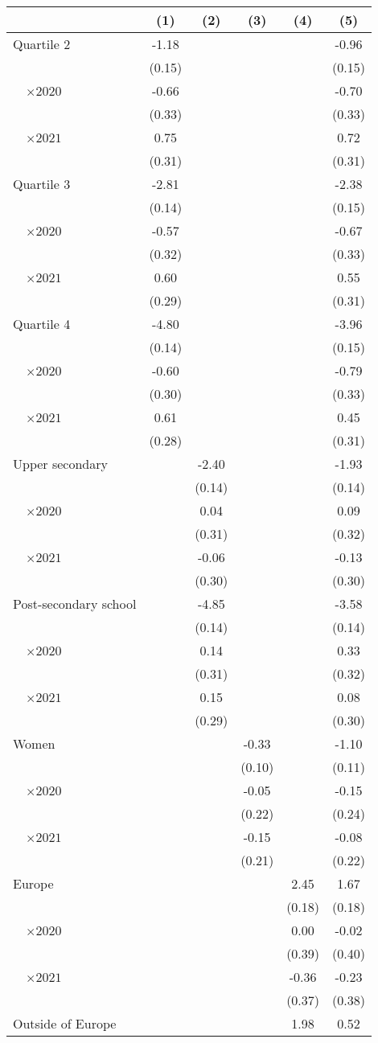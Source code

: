 
\begin{tabular}{@{}l*{5}{S[table-format={-}2.2{\tnote{***}}]}@{}}
\toprule
{} & {(1)} & {(2)} & {(3)} & {(4)} & {(5)}\tabularnewline%
\midrule
Quartile 2 & -1.18\tnote{***} &  &  &  & -0.96\tnote{***}\tabularnewline%
 & (0.15) &  &  &  & (0.15)\tabularnewline%
~~\(\times 2020\) & -0.66\tnote{*} &  &  &  & -0.70\tnote{*}\tabularnewline%
 & (0.33) &  &  &  & (0.33)\tabularnewline%
~~\(\times 2021\) & 0.75\tnote{*} &  &  &  & 0.72\tnote{*}\tabularnewline%
 & (0.31) &  &  &  & (0.31)\tabularnewline%
Quartile 3 & -2.81\tnote{***} &  &  &  & -2.38\tnote{***}\tabularnewline%
 & (0.14) &  &  &  & \vphantom{1} (0.15)\tabularnewline%
~~\(\times 2020\) & -0.57\tnote{\dagger} &  &  &  & -0.67\tnote{*}\tabularnewline%
 & (0.32) &  &  &  & (0.33)\tabularnewline%
~~\(\times 2021\) & 0.60\tnote{*} &  &  &  & 0.55\tnote{\dagger}\tabularnewline%
 & (0.29) &  &  &  & (0.31)\tabularnewline%
Quartile 4 & -4.80\tnote{***} &  &  &  & -3.96\tnote{***}\tabularnewline%
 & (0.14) &  &  &  & (0.15)\tabularnewline%
~~\(\times 2020\) & -0.60\tnote{*} &  &  &  & -0.79\tnote{*}\tabularnewline%
 & (0.30) &  &  &  & (0.33)\tabularnewline%
~~\(\times 2021\) & 0.61\tnote{*} &  &  &  & 0.45\tabularnewline%
 & (0.28) &  &  &  & (0.31)\tabularnewline%
Upper secondary &  & -2.40\tnote{***} &  &  & -1.93\tnote{***}\tabularnewline%
 &  & (0.14) &  &  & \vphantom{1} (0.14)\tabularnewline%
~~\(\times 2020\) &  & 0.04 &  &  & 0.09\tabularnewline%
 &  & (0.31) &  &  & \vphantom{1} (0.32)\tabularnewline%
~~\(\times 2021\) &  & -0.06 &  &  & -0.13\tabularnewline%
 &  & (0.30) &  &  & (0.30)\tabularnewline%
Post-secondary school &  & -4.85\tnote{***} &  &  & -3.58\tnote{***}\tabularnewline%
 &  & (0.14) &  &  & (0.14)\tabularnewline%
~~\(\times 2020\) &  & 0.14 &  &  & 0.33\tabularnewline%
 &  & (0.31) &  &  & (0.32)\tabularnewline%
~~\(\times 2021\) &  & 0.15 &  &  & 0.08\tabularnewline%
 &  & (0.29) &  &  & (0.30)\tabularnewline%
Women &  &  & -0.33\tnote{**} &  & -1.10\tnote{***}\tabularnewline%
 &  &  & (0.10) &  & (0.11)\tabularnewline%
~~\(\times 2020\) &  &  & -0.05 &  & -0.15\tabularnewline%
 &  &  & (0.22) &  & (0.24)\tabularnewline%
~~\(\times 2021\) &  &  & -0.15 &  & -0.08\tabularnewline%
 &  &  & (0.21) &  & (0.22)\tabularnewline%
Europe &  &  &  & 2.45\tnote{***} & 1.67\tnote{***}\tabularnewline%
 &  &  &  & (0.18) & (0.18)\tabularnewline%
~~\(\times 2020\) &  &  &  & 0.00 & -0.02\tabularnewline%
 &  &  &  & (0.39) & (0.40)\tabularnewline%
~~\(\times 2021\) &  &  &  & -0.36 & -0.23\tabularnewline%
 &  &  &  & (0.37) & (0.38)\tabularnewline%
Outside of Europe &  &  &  & 1.98\tnote{***} & 0.52\tnote{*}\tabularnewline%

\end{tabular}
